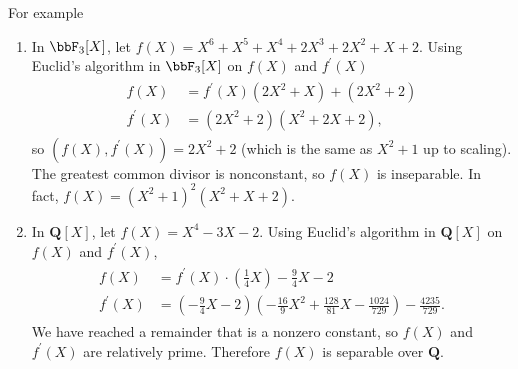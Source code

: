 \documentclass{article}
\begin{document}
\begin{exma}For example
\begin{enumerate}
    \item In $\bbF_{3}[X]$, let $f(X)=X^{6}+X^{5}+X^{4}+2 X^{3}+2 X^{2}+X+2$. Using Euclid's algorithm in $\bbF_{3}[X]$ on $f(X)$ and $f^{\prime}(X)$
\begin{align*}
\begin{aligned}
f(X) &=f^{\prime}(X)\left(2 X^{2}+X\right)+\left(2 X^{2}+2\right) \\
f^{\prime}(X) &=\left(2 X^{2}+2\right)\left(X^{2}+2 X+2\right),
\end{aligned}
\end{align*}
so $\left(f(X), f^{\prime}(X)\right)=2 X^{2}+2$ (which is the same as $X^{2}+1$ up to scaling). The greatest common divisor is nonconstant, so $f(X)$ is inseparable. In fact, $f(X)=\left(X^{2}+1\right)^{2}\left(X^{2}+X+2\right)$. 
\item In $\mathbf{Q}[X]$, let $f(X)=X^{4}-3 X-2$. Using Euclid's algorithm in $\mathbf{Q}[X]$ on $f(X)$ and $f^{\prime}(X)$,
\begin{align*}
\begin{aligned}
f(X) &=f^{\prime}(X) \cdot\left(\frac{1}{4} X\right)-\frac{9}{4} X-2 \\
f^{\prime}(X) &=\left(-\frac{9}{4} X-2\right)\left(-\frac{16}{9} X^{2}+\frac{128}{81} X-\frac{1024}{729}\right)-\frac{4235}{729} .
\end{aligned}
\end{align*}
We have reached a remainder that is a nonzero constant, so $f(X)$ and $f^{\prime}(X)$ are relatively prime. Therefore $f(X)$ is separable over $\mathbf{Q}$.
\end{enumerate}
\end{exma}



\end{document}
